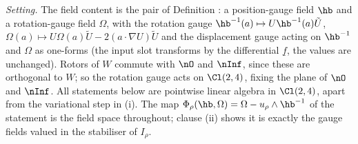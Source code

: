 \emph{Setting.} The field content is the pair of Definition : a position-gauge field $\hb$ and a rotation-gauge field $\Omega$, with the rotation gauge $\hb^{-1}(a) \mapsto U\hb^{-1}(a)\tilde{U}$, $\Omega(a) \mapsto U\Omega(a)\tilde{U} - 2(a \cdot \nabla U)\tilde{U}$ and the displacement gauge acting on $\hb^{-1}$ and $\Omega$ as one-forms (the input slot transforms by the differential $\underline{f}$, the values are unchanged). Rotors of $W$ commute with $\nO$ and $\nInf$, since these are orthogonal to $W$; so the rotation gauge acts on $\Cl(2,4)$, fixing the plane of $\nO$ and $\nInf$. All statements below are pointwise linear algebra in $\Cl(2,4)$, apart from the variational step in (i). The map $\Phi_{\rho}(\hb, \Omega) = \Omega - u_{\rho} \wedge \hb^{-1}$ of the statement is the field space throughout; clause (ii) shows it is exactly the gauge fields valued in the stabiliser of $I_{\rho}$.


